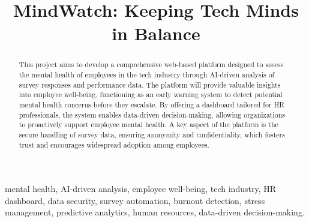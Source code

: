 \documentclass[conference]{IEEEtran}
\begin{document}
\title{MindWatch: Keeping Tech Minds in Balance\\
{\footnotesize \textsuperscript{}}
}

\author{
\and
{}
\and
{}
\and
{}
}

\maketitle

\begin{abstract}
    This project aims to develop a comprehensive web-based
    platform designed to assess the mental health of employees in
    the tech industry through AI-driven analysis of survey
    responses and performance data. The platform will provide
    valuable insights into employee well-being, functioning as an
    early warning system to detect potential mental health concerns
    before they escalate. By offering a dashboard tailored for HR
    professionals, the system enables data-driven decision-making,
    allowing organizations to proactively support employee mental
    health. A key aspect of the platform is the secure handling of
    survey data, ensuring anonymity and confidentiality, which
    fosters trust and encourages widespread adoption among
    employees.
\end{abstract}

\begin{IEEEkeywords}
    mental health, AI-driven analysis, employee well-being, tech industry, HR dashboard, data security, survey automation, burnout detection, stress management, predictive analytics, human resources, data-driven decision-making.
\end{IEEEkeywords}
\end{document}
